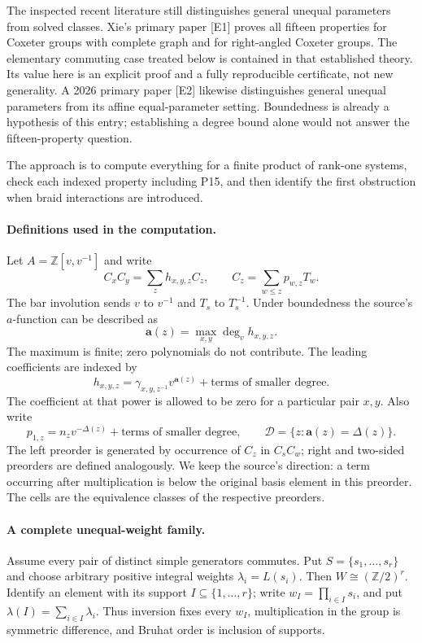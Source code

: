 \documentclass[11pt]{article}
\begin{document}
The inspected recent literature still distinguishes general unequal
parameters from solved classes. Xie's primary paper [E1] proves all
fifteen properties for Coxeter groups with complete graph and for
right-angled Coxeter groups. The elementary commuting case treated
below is contained in that established theory. Its value here is an
explicit proof and a fully reproducible certificate, not new generality.
A 2026 primary paper [E2] likewise distinguishes general unequal
parameters from its affine equal-parameter setting. Boundedness is
already a hypothesis of this entry; establishing a degree bound alone
would not answer the fifteen-property question.

The approach is to compute everything for a finite product of rank-one
systems, check each indexed property including P15, and then identify
the first obstruction when braid interactions are introduced.

\paragraph{Definitions used in the computation.}
Let $A=\mathbb Z[v,v^{-1}]$ and write
\[
 C_xC_y=\sum_z h_{x,y,z}C_z,\qquad
 C_z=\sum_{w\leq z}p_{w,z}T_w.
\]
The bar involution sends $v$ to $v^{-1}$ and $T_s$ to $T_s^{-1}$.
Under boundedness the source's $a$-function can be described as
\[
 \mathbf a(z)=\max_{x,y}\deg_v h_{x,y,z}.
\]
The maximum is finite; zero polynomials do not contribute.
The leading coefficients are indexed by
\[
 h_{x,y,z}=\gamma_{x,y,z^{-1}}v^{\mathbf a(z)}
                  +\text{terms of smaller degree}.
\]
The coefficient at that power is allowed to be zero for a particular
pair $x,y$. Also write
\[
 p_{1,z}=n_zv^{-\Delta(z)}+\text{terms of smaller degree},
 \qquad\mathcal D=\{z:\mathbf a(z)=\Delta(z)\}.
\]
The left preorder is generated by occurrence of $C_z$ in $C_sC_w$;
right and two-sided preorders are defined analogously. We keep the
source's direction: a term occurring after multiplication is below
the original basis element in this preorder. The cells are the
equivalence classes of the respective preorders.

\paragraph{A complete unequal-weight family.}
Assume every pair of distinct simple generators commutes. Put
$S=\{s_1,\ldots,s_r\}$ and choose arbitrary positive integral weights
$\lambda_i=L(s_i)$. Then $W\cong(\mathbb Z/2)^r$.
Identify an element with its support $I\subseteq\{1,\ldots,r\}$;
write $w_I=\prod_{i\in I}s_i$, and put
$\lambda(I)=\sum_{i\in I}\lambda_i$. Thus inversion fixes every
$w_I$, multiplication in the group is symmetric difference, and Bruhat
order is inclusion of supports.
\end{document}
